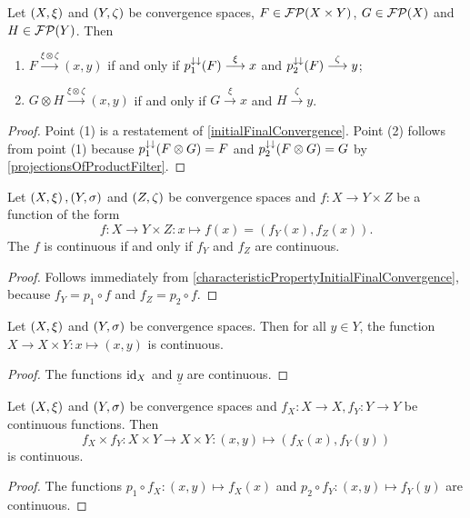 \begin{lemma} \label{convergenceFiniteProductFilter}
Let $\left( X,\xi \right)$ and $\left( Y,\zeta \right)$ be convergence spaces, $F\in \operatorname{\mathcal{FP}}(X\times Y)$, $G\in \operatorname{\mathcal{FP}}(X)$ and $H\in \operatorname{\mathcal{FP}}(Y)$. Then
\begin{enumerate}
\item $F \overset{\xi \otimes \zeta}{\longrightarrow} (x,y)$ \textup{if and only if} $p_1^{\downarrow\downarrow}(F) \overset{\xi}{\longrightarrow} x$ and $p_2^{\downarrow\downarrow}(F) \overset{\zeta}{\longrightarrow} y$;
\item $G\otimes H \overset{\xi \otimes \zeta}{\longrightarrow} (x,y)$ \textup{if and only if} $G \overset{\xi}{\longrightarrow} x$ and $H \overset{\zeta}{\longrightarrow} y$.
\end{enumerate}
\end{lemma}
\begin{proof}
Point (1) is a restatement of \ref{initialFinalConvergence}. Point (2) follows from point (1) because $p_1^{\downarrow\downarrow}(F\otimes G) = F$ and $p_2^{\downarrow\downarrow}(F\otimes G) = G$ by \ref{projectionsOfProductFilter}.
\end{proof}


\begin{lemma} \label{continuityFunctionTuple}
Let $\left( X,\xi \right), \left( Y,\sigma \right)$ and $\left( Z,\zeta \right)$ be convergence spaces and $f: X\to Y\times Z$ be a function of the form
\[ f: X\to Y\times Z: x\mapsto f(x) = (f_Y(x), f_Z(x)). \]
The $f$ is continuous \textup{if and only if} $f_Y$ and $f_Z$ are continuous.
\end{lemma}
\begin{proof}
Follows immediately from \ref{characteristicPropertyInitialFinalConvergence},
because $f_Y = p_1\circ f$ and $f_Z = p_2\circ f$.
\end{proof}
\begin{corollary} \label{continuousEmbeddingProduct}
Let $\left( X,\xi \right)$ and $\left( Y,\sigma \right)$ be convergence spaces. Then for all $y\in Y$, the function $X\to X\times Y: x\mapsto (x,y)$ is continuous.
\end{corollary}
\begin{proof}
The functions $\operatorname{id}_X$ and $\underline{y}$ are continuous.
\end{proof}
\begin{corollary} \label{productContinuousFunctions}
Let $\left( X,\xi \right)$ and $\left( Y,\sigma \right)$ be convergence spaces and $f_X: X\to X, f_Y: Y\to Y$ be continuous functions. Then
\[ f_X\times f_Y: X\times Y \to X\times Y: (x,y)\mapsto (f_X(x), f_Y(y))  \]
is continuous.
\end{corollary}
\begin{proof}
The functions $p_1\circ f_X: (x,y) \mapsto f_X(x)$ and $p_2\circ f_Y: (x,y) \mapsto f_Y(y)$ are continuous.
\end{proof}

